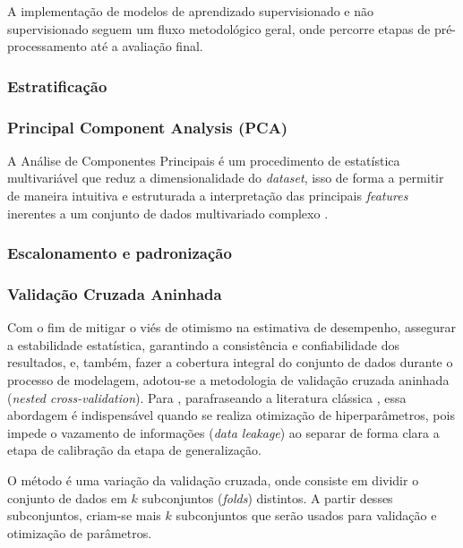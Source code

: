 \documentclass{uflamon}          %
\begin{document}
A implementação de modelos de aprendizado supervisionado e não supervisionado seguem um fluxo metodológico geral, onde percorre etapas de pré-processamento até a avaliação final.

\subsubsection{Estratificação}

\subsubsection{Principal Component Analysis (PCA)}

A Análise de Componentes Principais é um procedimento de estatística multivariável que reduz a dimensionalidade do \textit{dataset}, isso de forma a permitir de maneira intuitiva e estruturada a interpretação das principais \textit{features} inerentes a um conjunto de dados multivariado complexo \cite{greenacre2022}.

\subsubsection{Escalonamento e padronização}

\subsubsection{Validação Cruzada Aninhada}

Com o fim de mitigar o viés de otimismo na estimativa de desempenho, assegurar a estabilidade estatística, garantindo a consistência e confiabilidade dos resultados, e, também, fazer a cobertura integral do conjunto de dados durante o processo de modelagem, adotou-se a metodologia de validação cruzada aninhada (\textit{nested cross-validation}). Para , parafraseando a literatura clássica \cite{stone1974, varma2006}, essa abordagem é indispensável quando se realiza otimização de hiperparâmetros, pois impede o vazamento de informações (\textit{data leakage}) ao separar de forma clara a etapa de calibração da etapa de generalização.

O método é uma variação da validação cruzada, onde consiste em dividir o conjunto de dados em $k$ subconjuntos (\textit{folds}) distintos. A partir desses subconjuntos, criam-se mais $k$ subconjuntos que serão usados para validação e otimização de parâmetros.
\end{document}
